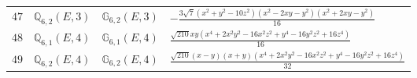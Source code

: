 \documentclass[fleqn,8pt,landscape]{jsarticle}
\begin{document}
\begin{table}[ht!]
\begin{center}
\begin{tabular}{cccl}
$ 47 $ & $ \mathbb{Q}_{6,2}(E,3) $ & $ \mathbb{G}_{6,2}(E,3) $ & $ - \frac{3 \sqrt{7} \left(x^{2} + y^{2} - 10 z^{2}\right) \left(x^{2} - 2 x y - y^{2}\right) \left(x^{2} + 2 x y - y^{2}\right)}{16} $ \\
$ 48 $ & $ \mathbb{Q}_{6,1}(E,4) $ & $ \mathbb{G}_{6,1}(E,4) $ & $ \frac{\sqrt{210} x y \left(x^{4} + 2 x^{2} y^{2} - 16 x^{2} z^{2} + y^{4} - 16 y^{2} z^{2} + 16 z^{4}\right)}{16} $ \\
$ 49 $ & $ \mathbb{Q}_{6,2}(E,4) $ & $ \mathbb{G}_{6,2}(E,4) $ & $ \frac{\sqrt{210} \left(x - y\right) \left(x + y\right) \left(x^{4} + 2 x^{2} y^{2} - 16 x^{2} z^{2} + y^{4} - 16 y^{2} z^{2} + 16 z^{4}\right)}{32} $ \\
 \hline \hline
\end{tabular}
\end{center}
\end{table}
\end{document}
